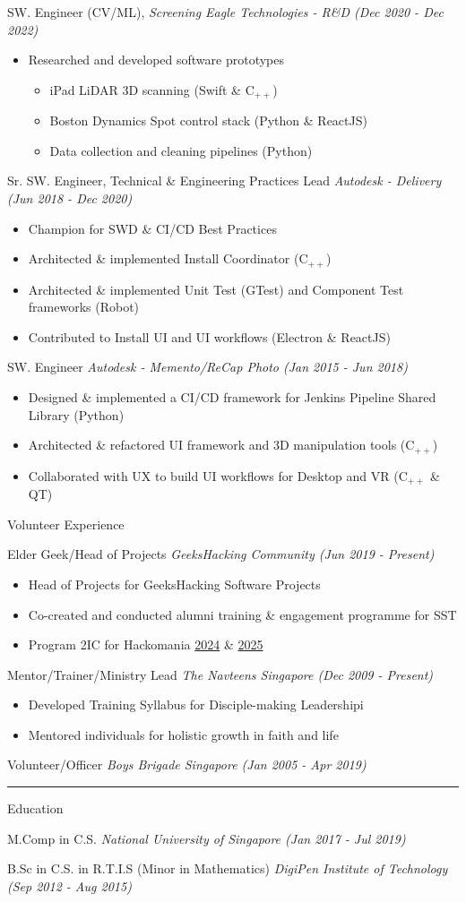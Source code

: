 \documentclass[letterpaper,11pt]{article}
\newcommand{\cvtitle}[1]{\Large\raggedright \textcolor{section_color}{#1}\\}
\newcommand{\cvhead}[1]{\large\raggedright \textcolor{subsection_color}{#1}\\}
\newcommand{\cvlist}[1]{\vspace{-12pt}\small \textcolor{item_color}{\begin{itemize}#1\end{itemize}}}
\newcommand{\cvli}[1]{\vspace{-4pt} \item{#1}}
\newcommand{\cvline}[0]{\noindent\rule{19cm}{0.4pt}}
\newcommand{\link}[2]{\textcolor{link_color}{\href{#1}{#2}}}
\newcommand{\qualifier}[1]{\hfill \textsl{\footnotesize #1}}
\begin{document}
\cvhead{SW. Engineer (CV/ML), \qualifier{Screening Eagle Technologies - R\&D (Dec 2020 - Dec 2022)}}
\cvlist{
    \cvli{Researched and developed software prototypes}
    \vspace{8pt}
    \cvlist{
        \cvli{iPad LiDAR 3D scanning (Swift \& C$_{++}$)}
        \cvli{Boston Dynamics Spot control stack (Python \& ReactJS)}
        \cvli{Data collection and cleaning pipelines (Python)}
    }
}

\cvhead{Sr. SW. Engineer, Technical \& Engineering Practices Lead \qualifier{Autodesk - Delivery (Jun 2018 - Dec 2020)}}
\cvlist{
    \cvli{Champion for SWD \& CI/CD Best Practices}
    \cvli{Architected \& implemented Install Coordinator (C$_{++}$)}
    \cvli{Architected \& implemented Unit Test (GTest) and Component Test frameworks (Robot)}
    \cvli{Contributed to Install UI and UI workflows (Electron \& ReactJS)}
}

\cvhead{SW. Engineer \qualifier{Autodesk - Memento/ReCap Photo (Jan 2015 - Jun 2018)}}
\cvlist{
    \cvli{Designed \& implemented a CI/CD framework for Jenkins Pipeline Shared Library (Python)}
    \cvli{Architected \& refactored UI framework and 3D manipulation tools (C$_{++}$)}
    \cvli{Collaborated with UX to build UI workflows for Desktop and VR (C$_{++}$ \& QT)}
}

\cvtitle{Volunteer Experience}

\cvhead{Elder Geek/Head of Projects \qualifier{GeeksHacking Community (Jun 2019 - Present)}}
\cvlist{
    \cvli{Head of Projects for GeeksHacking Software Projects}
    \cvli{Co-created and conducted alumni training \& engagement programme for SST}
    \cvli{Program 2IC for Hackomania \link{https://hackomania2024.geekshacking.com/}{2024} \& \link{https://hackomania2025.geekshacking.com/}{2025}}
}

\cvhead{Mentor/Trainer/Ministry Lead \qualifier{The Navteens Singapore (Dec 2009 - Present)}}
\cvlist{
    \cvli{Developed Training Syllabus for Disciple-making Leadershipi}
    \cvli{Mentored individuals for holistic growth in faith and life}
}

\cvhead{Volunteer/Officer \qualifier{Boys Brigade Singapore (Jan 2005 - Apr 2019)}}

\cvline

\cvtitle{Education}

\cvhead{M.Comp in C.S. \qualifier{National University of Singapore (Jan 2017 - Jul 2019)}}

\cvhead{B.Sc in C.S. in R.T.I.S (Minor in Mathematics) \qualifier{DigiPen Institute of Technology (Sep 2012 - Aug 2015)}}
\end{document}
